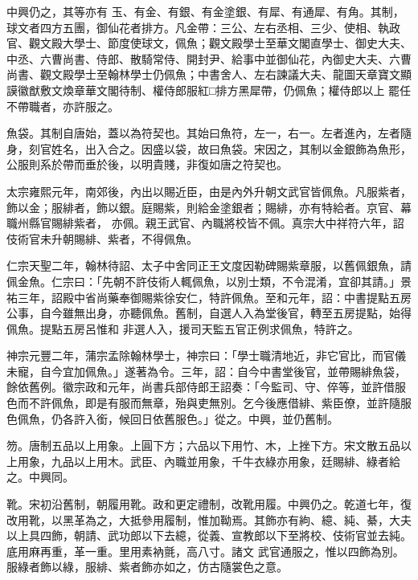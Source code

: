 \begin{pinyinscope}
 中興仍之，其等亦有
 玉、有金、有銀、有金塗銀、有犀、有通犀、有角。其制，球文者四方五團，御仙花者排方。凡金帶：三公、左右丞相、三少、使相、執政官、觀文殿大學士、節度使球文，佩魚；觀文殿學士至華文閣直學士、御史大夫、中丞、六曹尚書、侍郎、散騎常侍、開封尹、給事中並御仙花，內御史大夫、六曹尚書、觀文殿學士至翰林學士仍佩魚；中書舍人、左右諫議大夫、龍圖天章寶文顯謨徽猷敷文煥章華文閣待制、權侍郎服紅□排方黑犀帶，仍佩魚；權侍郎以上
 罷任不帶職者，亦許服之。



 魚袋。其制自唐始，蓋以為符契也。其始曰魚符，左一，右一。左者進內，左者隨身，刻官姓名，出入合之。因盛以袋，故曰魚袋。宋因之，其制以金銀飾為魚形，公服則系於帶而垂於後，以明貴賤，非復如唐之符契也。



 太宗雍熙元年，南郊後，內出以賜近臣，由是內外升朝文武官皆佩魚。凡服紫者，飾以金；服緋者，飾以銀。庭賜紫，則給金塗銀者；賜緋，亦有特給者。京官、幕職州縣官賜緋紫者，
 亦佩。親王武官、內職將校皆不佩。真宗大中祥符六年，詔伎術官未升朝賜緋、紫者，不得佩魚。



 仁宗天聖二年，翰林待詔、太子中舍同正王文度因勒碑賜紫章服，以舊佩銀魚，請佩金魚。仁宗曰：「先朝不許伎術人輒佩魚，以別士類，不令混淆，宜卻其請。」景祐三年，詔殿中省尚藥奉御賜紫徐安仁，特許佩魚。至和元年，詔：中書提點五房公事，自今雖無出身，亦聽佩魚。舊制，自選人入為堂後官，轉至五房提點，始得佩魚。提點五房呂惟和
 非選人入，援司天監五官正例求佩魚，特許之。



 神宗元豐二年，蒲宗孟除翰林學士，神宗曰：「學士職清地近，非它官比，而官儀未寵，自今宜加佩魚。」遂著為令。三年，詔：自今中書堂後官，並帶賜緋魚袋，餘依舊例。徽宗政和元年，尚書兵部侍郎王詔奏：「今監司、守、倅等，並許借服色而不許佩魚，即是有服而無章，殆與吏無別。乞今後應借緋、紫臣僚，並許隨服色佩魚，仍各許入銜，候回日依舊服色。」從之。中興，並仍舊制。



 笏。唐制五品以上用象。上圓下方；六品以下用竹、木，上挫下方。宋文散五品以上用象，九品以上用木。武臣、內職並用象，千牛衣綠亦用象，廷賜緋、綠者給之。中興同。



 靴。宋初沿舊制，朝履用靴。政和更定禮制，改靴用履。中興仍之。乾道七年，復改用靴，以黑革為之，大抵參用履制，惟加靿焉。其飾亦有絇、繶、純、綦，大夫以上具四飾，朝請、武功郎以下去繶，從義、宣教郎以下至將校、伎術官並去純。底用麻再重，革一重。里用素衲氈，高八寸。諸文
 武官通服之，惟以四飾為別。服綠者飾以綠，服緋、紫者飾亦如之，仿古隨裳色之意。




\end{pinyinscope}
